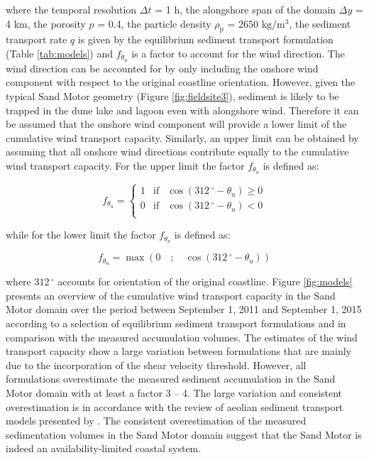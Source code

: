 \noindent where the temporal resolution $\Delta t$ = 1 h, the
alongshore span of the domain $\Delta y$ = 4 km, the porosity $p$ =
0.4, the particle density $\rho_{\mathrm{p}}$ = 2650
$\mathrm{kg/m^3}$, the sediment transport rate $q$ is given by the
equilibrium sediment transport formulation (Table \ref{tab:models})
and $f_{\theta_u}$ is a factor to account for the wind direction. The
wind direction can be accounted for by only including the onshore wind
component with respect to the original coastline orientation. However,
given the typical Sand Motor geometry (Figure \ref{fig:fieldsite3}),
sediment is likely to be trapped in the dune lake and lagoon even with
alongshore wind. Therefore it can be assumed that the onshore wind
component will provide a lower limit of the cumulative wind transport
capacity. Similarly, an upper limit can be obtained by assuming that
all onshore wind directions contribute equally to the cumulative wind
transport capacity. For the upper limit the factor $f_{\theta_u}$ is
defined as:

\begin{equation}
  f_{\theta_u} = \left\{
      \begin{array}{rcl}
        1 & \mathrm{if} & \cos \left( 312\,^{\circ} - \theta_u \right) \geq 0 \\
        0 & \mathrm{if} & \cos \left( 312\,^{\circ} - \theta_u \right) < 0 \\
      \end{array}
    \right.
\end{equation}

\noindent while for the lower limit the factor $f_{\theta_u}$ is defined
as:

\begin{equation}
  f_{\theta_u} = \max \left( 0 \quad ; \quad \cos \left( 312\,^{\circ} - \theta_u \right) \right)
\end{equation}

\noindent where $312\,^{\circ}$ accounts for orientation of the original
coastline.  Figure \ref{fig:models} presents an overview of the
cumulative wind transport capacity in the Sand Motor domain over the
period between September 1, 2011 and September 1, 2015 according to a
selection of equilibrium sediment transport formulations and in
comparison with the measured accumulation volumes. The estimates of
the wind transport capacity show a large variation between
formulations that are mainly due to the incorporation of the shear
velocity threshold. However, all formulations overestimate the
measured sediment accumulation in the Sand Motor domain with at least
a factor 3 -- 4. The large variation and consistent overestimation is
in accordance with the review of aeolian sediment transport models
presented by \citet{Sherman2012}. The consistent overestimation of the
measured sedimentation volumes in the Sand Motor domain suggest that
the Sand Motor is indeed an availability-limited coastal system.

